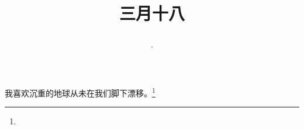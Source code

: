 \title{\date[d=26,m=4,y=2024][year:cn-y,年,month:cn,day:cn,日,·,weekday]·三月十八 }
我喜欢沉重的地球从未在我们脚下漂移。\footnote{ }

